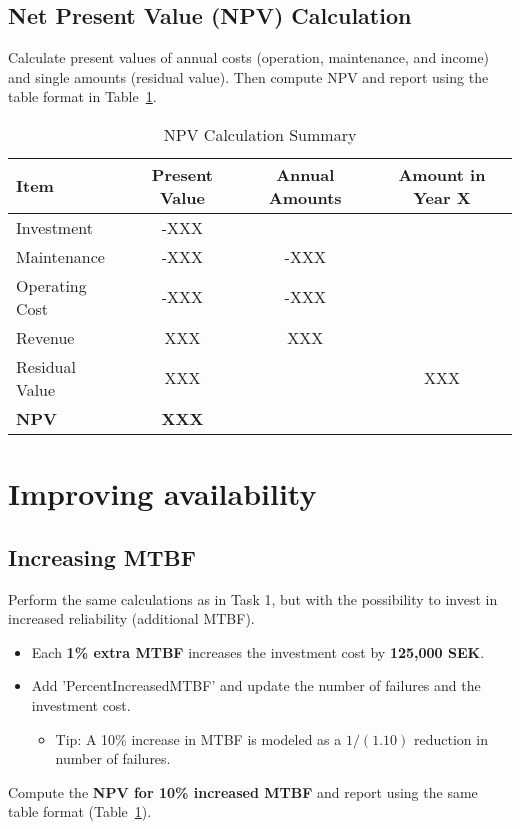 \documentclass[a4paper,12pt]{exam}
\begin{document}
\subsection{Net Present Value (NPV) Calculation}
Calculate present values of annual costs (operation, maintenance, and income) and single amounts (residual value). Then compute NPV and report using the table format in Table~\ref{NPVtable}.

\begin{table}[h]
    \centering
    \begin{tabular}{lccc}
        \toprule
        \textbf{Item} & \textbf{Present Value} & \textbf{Annual Amounts} & \textbf{Amount in Year X} \\
        \midrule
        Investment & -XXX &  &  \\
        Maintenance & -XXX & -XXX &  \\
        Operating Cost & -XXX & -XXX &  \\
        Revenue & XXX & XXX &  \\
        Residual Value & XXX &  & XXX \\
        \textbf{NPV} & \textbf{XXX} &  &  \\
        \bottomrule
    \end{tabular}
    \caption{NPV Calculation Summary}
    \label{NPVtable}
\end{table}

\section{Improving availability}
\subsection{Increasing MTBF}
Perform the same calculations as in Task 1, but with the possibility to invest in increased reliability (additional MTBF). 
\begin{itemize}
    \item Each \textbf{1\% extra MTBF} increases the investment cost by \textbf{125,000 SEK}.     
    \item Add 'PercentIncreasedMTBF' and update the number of failures and the investment cost.
    \begin{itemize}
        \item Tip: A 10\% increase in MTBF is modeled as a $1/(1.10)$ reduction in number of failures.
    \end{itemize}
\end{itemize}
Compute the \textbf{NPV for 10\% increased MTBF} and report using the same table format (Table~\ref{NPVtable}).
\end{document}
